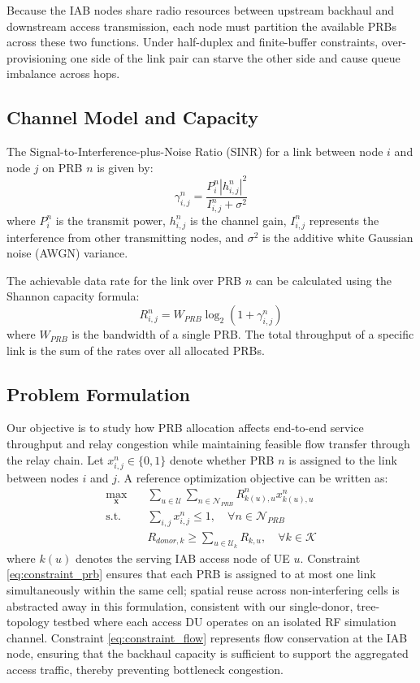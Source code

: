 \documentclass[conference, a4paper]{IEEEtran}
\begin{document}
Because the IAB nodes share radio resources between upstream backhaul and downstream access transmission, each node must partition the available PRBs across these two functions. Under half-duplex and finite-buffer constraints, over-provisioning one side of the link pair can starve the other side and cause queue imbalance across hops.

\subsection{Channel Model and Capacity}
The Signal-to-Interference-plus-Noise Ratio (SINR) for a link between node $i$ and node $j$ on PRB $n$ is given by:
\begin{equation}
    \gamma_{i,j}^n = \frac{P_{i}^n |h_{i,j}^n|^2}{I_{i,j}^n + \sigma^2}
\end{equation}
where $P_{i}^n$ is the transmit power, $h_{i,j}^n$ is the channel gain, $I_{i,j}^n$ represents the interference from other transmitting nodes, and $\sigma^2$ is the additive white Gaussian noise (AWGN) variance.

The achievable data rate for the link over PRB $n$ can be calculated using the Shannon capacity formula:
\begin{equation}
    R_{i,j}^n = W_{PRB} \log_2(1 + \gamma_{i,j}^n)
\end{equation}
where $W_{PRB}$ is the bandwidth of a single PRB. The total throughput of a specific link is the sum of the rates over all allocated PRBs.

\subsection{Problem Formulation}
Our objective is to study how PRB allocation affects end-to-end service throughput and relay congestion while maintaining feasible flow transfer through the relay chain. Let $x_{i,j}^n \in \{0, 1\}$ denote whether PRB $n$ is assigned to the link between nodes $i$ and $j$. A reference optimization objective can be written as:
\begin{align}
    \max_{\mathbf{x}} \quad & \sum_{u \in \mathcal{U}} \sum_{n \in \mathcal{N}_{PRB}} R_{k(u),u}^n x_{k(u),u}^n \\
    \textrm{s.t.} \quad & \sum_{i,j} x_{i,j}^n \le 1, \quad \forall n \in \mathcal{N}_{PRB} \label{eq:constraint_prb} \\
    & R_{donor, k} \ge \sum_{u \in \mathcal{U}_k} R_{k, u}, \quad \forall k \in \mathcal{K} \label{eq:constraint_flow}
\end{align}
where $k(u)$ denotes the serving IAB access node of UE $u$. Constraint \eqref{eq:constraint_prb} ensures that each PRB is assigned to at most one link simultaneously within the same cell; spatial reuse across non-interfering cells is abstracted away in this formulation, consistent with our single-donor, tree-topology testbed where each access DU operates on an isolated RF simulation channel. Constraint \eqref{eq:constraint_flow} represents flow conservation at the IAB node, ensuring that the backhaul capacity is sufficient to support the aggregated access traffic, thereby preventing bottleneck congestion.
\end{document}
